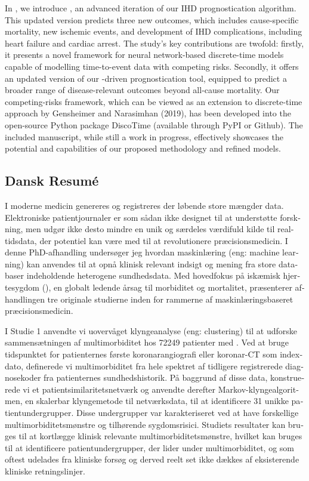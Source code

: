 \begin{@empty}
In \studyiii{}, 
we introduce , an advanced iteration of our 
\ac{IHD} prognostication algorithm.
This updated version predicts three new outcomes,
which includes cause-specific mortality,
new ischemic events, and development of 
\ac{IHD} complications, including heart failure and 
cardiac arrest.
The study's key contributions are twofold: 
firstly, it presents a novel framework for neural network-based discrete-time 
models capable of modelling time-to-event data with competing risks. 
Secondly, it offers an updated version
of our -driven prognostication tool, 
equipped to predict a broader range of disease-relevant outcomes 
beyond all-cause mortality. 
Our competing-risks framework,
which can be viewed as an extension to discrete-time approach by 
Gensheimer and Narasimhan (2019), 
has been developed into the open-source Python package \textsf{DiscoTime}
(available through PyPI or Github). 
The included manuscript, while still a work in progress, 
effectively showcases the potential and capabilities 
of our proposed methodology and refined models.

\begin{otherlanguage}{danish}
\chapter*{Dansk Resumé}

I moderne medicin genereres og registreres der løbende store mængder data.
Elektroniske patientjournaler 
er som sådan ikke designet til at understøtte forskning,
men udgør ikke desto mindre en unik og særdeles værdifuld kilde til
realtidsdata, der potentiel kan være med til at revolutionere præcisionsmedicin.
I denne PhD-afhandling undersøger jeg hvordan maskinlæring 
(eng: machine learning) kan anvendes til at 
opnå klinisk relevant indsigt og mening
fra store databaser indeholdende heterogene sundhedsdata. 
Med hovedfokus på iskæmisk hjertesygdom (),
en globalt ledende årsag til morbiditet og mortalitet, 
præsenterer afhandlingen tre originale studierne
inden for rammerne af maskinlæringsbaseret præcisionsmedicin.

I Studie 1 anvendte vi uovervåget klyngeanalyse (eng: clustering) 
til at udforske sammensætningen af multimorbiditet hos \num{72249} patienter 
med . 
Ved at bruge tidspunktet for patienternes første koronarangiografi eller 
koronar-CT som indexdato, 
definerede vi multimorbiditet fra hele spektret af tidligere 
registrerede diagnosekoder fra patienternes sundhedshistorik. 
På baggrund af disse data, konstruerede vi et patientsimilaritetsnetværk 
og anvendte derefter Markov-klyngealgoritmen, 
en skalerbar klyngemetode til netværksdata, 
til at identificere 31 unikke patientundergrupper. 
Disse undergrupper var karakteriseret ved at have forskellige 
multimorbiditetsmønstre og tilhørende sygdomsrisici.
Studiets resultater kan bruges til at kortlægge klinisk relevante 
multimorbiditetsmønstre, hvilket kan bruges til at identificere 
patientundergrupper, der lider under multimorbiditet,
og som oftest udelades fra kliniske forsøg og derved reelt 
set ikke dækkes af eksisterende kliniske retningslinjer.


\end{otherlanguage}
\end{@empty}
